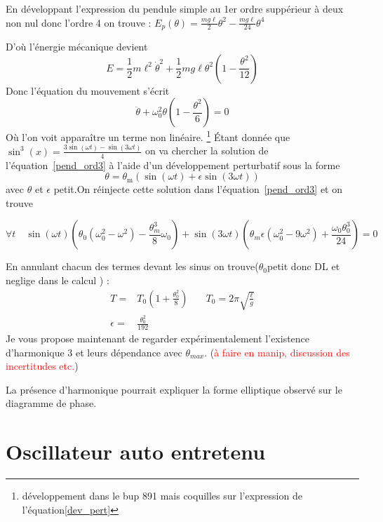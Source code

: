\documentclass{article}
\begin{document}
En développant l'expression du pendule simple au 1er ordre suppérieur à deux non nul donc l'ordre 4 on trouve : 
$E_p (\theta)=\frac{mg\ell}{2}\theta^2-\frac{mg \ell}{24}\theta^4 $

D'où l'énergie mécanique devient $$ E = \frac{1}{2} m \ell^2 \dot{\theta}^2+\frac{1}{2}mg\ell\theta^2\left(1-\frac{\theta^2}{12}\right)$$ Donc l'équation du mouvement s'écrit
\begin{equation}
    \ddot\theta + \omega_0^2\theta\left(1-\frac{\theta^2}{6}\right)=0
    \label{pend_ord3}
\end{equation}
Où l'on voit apparaître un terme non linéaire. \footnote{développement dans le bup 891 mais coquilles sur l'expression de l'équation\ref{dev_pert}}
Étant donnée que  $\sin^3(x)=\frac{3\sin(\omega t)-\sin(3\omega t)}{4}$ on va chercher la solution de l'équation~\ref{pend_ord3} à l'aide d'un développement perturbatif sous la forme  $$ \theta = \theta_\mathrm{m}\left( \sin(\omega t)+\epsilon \sin(3\omega t) \right)$$ 
avec $\theta$ et $\epsilon$ petit.On réinjecte cette solution dans l'équation~\ref{pend_ord3} et on trouve

\begin{equation}
    \forall t \quad \sin(\omega t) \left(\theta_0 \left(\omega_0^2-\omega^2\right) -\frac{\theta_m^3}{8}\omega_0\right) + \sin(3\omega t)\left( \theta_m \epsilon\left( \omega_0^2 - 9 \omega ^2\right) + \frac{\omega_0 \theta^3_0}{24}\right)=0
    \label{dev_pert}
\end{equation}

En annulant chacun des termes devant les sinus on trouve($\theta_0$petit donc DL et neglige dans le calcul ) : 
\begin{equation}
\begin{array}{clc}
     T=&T_0\left(1 +\frac{\theta_0^2}{8} \right)&\quad T_0=2\pi\sqrt{\frac{\ell}{g}}  \\
     \epsilon=& \frac{\theta_0^2}{192}
\end{array}
\end{equation}
Je vous propose maintenant de regarder expérimentalement l'existence d'harmonique 3 et leurs dépendance avec $\theta_{max}$. (\textcolor{red}{à faire en manip, discussion des incertitudes etc.})

La présence d'harmonique pourrait expliquer la forme elliptique observé sur le diagramme de phase.

\section{Oscillateur auto entretenu}
\end{document}
